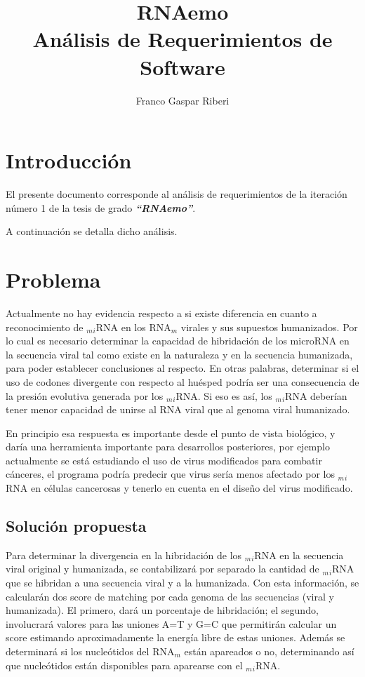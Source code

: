 \documentclass[12pt,a4paper,spanish]{article}
\title{\textbf{RNAemo}\\ \vspace{0.45cm} Análisis de Requerimientos de Software}
\author{Franco Gaspar Riberi}
\begin{document}
\maketitle\pagebreak{}\tableofcontents{}\pagebreak{}

\newpage


\section{Introducción}
	\par El presente documento corresponde al análisis de requerimientos de la iteración número 1 de la tesis de grado \textit{\textbf{``RNAemo''}}.
	\par A continuación se detalla dicho análisis.

\section{Problema}
	\par Actualmente no hay evidencia respecto a si existe diferencia en cuanto a reconocimiento de $_m$$_i$RNA en los 		RNA$_m$	virales y sus supuestos humanizados. Por lo cual es necesario determinar la capacidad de hibridación de los 	microRNA en la secuencia viral tal como existe en la naturaleza y en la secuencia humanizada, para poder establecer 	conclusiones al respecto. En otras palabras, determinar si el uso de codones divergente con respecto al huésped podría 		ser una consecuencia de la presión evolutiva generada por los $_m$$_i$RNA. Si eso es así, los $_m$$_i$RNA deberían 		tener menor capacidad de unirse al RNA viral que al genoma viral humanizado. 

	\par En principio esa respuesta es importante desde el punto de vista biológico, y daría una herramienta importante 	para desarrollos posteriores, por ejemplo actualmente se está estudiando el uso de virus modificados para combatir 		cánceres, el programa podría predecir que virus sería menos afectado por los $_m$$_i$RNA en células cancerosas y 		tenerlo en cuenta en el diseño del virus modificado.

	\subsection{Solución propuesta}
		\par Para determinar la divergencia en la hibridación de los $_m$$_i$RNA en la secuencia viral original y 			humanizada, se contabilizará por separado la cantidad de $_m$$_i$RNA que se hibridan a una secuencia viral y a la 			humanizada. Con esta información, se calcularán dos score de matching por cada genoma de las secuencias (viral y 			humanizada). El primero, dará un porcentaje de hibridación; el segundo, involucrará valores para las uniones 			\textsc{A=T} y \textsc{G=C} que permitirán calcular un score estimando aproximadamente la energía libre de estas 			uniones. Además se determinará si los nucleótidos del RNA$_m$ están apareados o no, determinando así que 			nucleótidos están disponibles para aparearse con el $_m$$_i$RNA.
\end{document}
